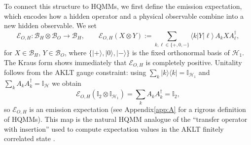 \documentclass[11pt,a4paper]{article}
\begin{document}
To connect this structure to HQMMs, we first define the emission expectation, which encodes how a hidden operator and a physical observable combine into a new hidden observable. We set
\begin{equation}\label{eq:EOH_def_HQMM}
\mathcal{E}_{O,H}:\mathcal{B}_H\otimes\mathcal{B}_O\to\mathcal{B}_H,
\qquad
\mathcal{E}_{O,H}(X\otimes Y)
:=
\sum_{k,\ell\in\{+,0,-\}}\langle k|Y|\ell\rangle\,A_k X A_{\ell}^{\dagger},
\end{equation}
for \(X\in\mathcal{B}_H\), \(Y\in\mathcal{B}_O\), where \(\{|+\rangle,|0\rangle,|-\rangle\}\) is the fixed orthonormal basis of \(\mathcal{H}_{1}\). The Kraus form shows immediately that \(\mathcal{E}_{O,H}\) is completely positive. Unitality follows from the AKLT gauge constraint: using \(\sum_k|k\rangle\langle k|=\mathbb{I}_{\mathcal{H}_{1}}\) and \(\sum_k A_kA_k^{\dagger}=\mathbb{I}_{\mathcal{H}}\) we obtain
\[
\mathcal{E}_{O,H}(\mathbb{I}_2\otimes\mathbb{I}_{\mathcal{H}_{1}})
=
\sum_{k}A_k A_k^{\dagger}
=
\mathbb{I}_2,
\]
so \(\mathcal{E}_{O,H}\) is an emission expectation (see Appendix\ref{app:A} for a rigrous definition of HQMMs). This map is the natural HQMM analogue of the “transfer operator with insertion” used to compute expectation values in the AKLT finitely correlated state \cite{FNW92}.
\end{document}
